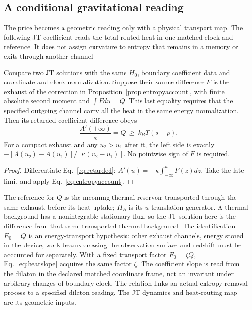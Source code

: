 \subsection{A conditional gravitational reading}

The price becomes a geometric reading only with a physical transport map.
The following JT coefficient reads the total routed heat in one
matched clock and reference. It does not assign curvature to entropy
that remains in a memory or exits through another channel.

\begin{proposition}\label{prop:heatslope}
Compare two JT solutions with the same $H_0$, boundary coefficient data and
coordinate and clock normalization. Suppose their source difference $F$ is the
exhaust of the correction in Proposition~\ref{prop:entropyaccount}, with finite
absolute second moment and $\int Fdu=Q$. This last equality requires that the
specified outgoing channel carry all the heat in the same energy normalization.
Then its retarded coefficient difference obeys
\begin{equation}
 -\frac{A'(+\infty)}\kappa=Q\ \ge\ k_BT(s-p).
 \label{eq:heatslope}
\end{equation}
For a compact exhaust and any $u_2>u_1$ after it, the left side is exactly
$-[A(u_2)-A(u_1)]/[\kappa(u_2-u_1)]$. No pointwise sign of $F$ is required.
\end{proposition}
\begin{proof}
Differentiate Eq.~\eqref{eq:retarded}: $A'(u)=-\kappa\int_{-\infty}^uF(z)dz$.
Take the late limit and apply Eq.~\eqref{eq:entropyaccount}.
\end{proof}

The reference for $Q$ is the incoming thermal reservoir transported through the
same exhaust, before its heat uptake; $H_B$ is its $u$-translation generator.
A thermal background has a nonintegrable stationary flux, so the JT solution here
is the difference from that same transported thermal background.
The identification $E_0=Q$ is an energy-transport hypothesis:
other exhaust channels, energy stored in the device, work beams crossing the
observation surface and redshift must be accounted for separately. With a fixed
transport factor $E_0=\zeta Q$, Eq.~\eqref{eq:heatslope} acquires the same factor
$\zeta$. The coefficient slope is read from the dilaton in the declared matched
coordinate frame, not an invariant under arbitrary changes of boundary clock.
The relation links an actual entropy-removal process to a specified dilaton reading.
The JT dynamics and heat-routing map are its geometric inputs.


